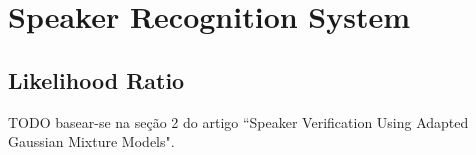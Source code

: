 \chapter{Speaker Recognition System}

\section{Likelihood Ratio}

TODO basear-se na seção 2 do artigo ``Speaker Verification Using Adapted Gaussian Mixture Models".